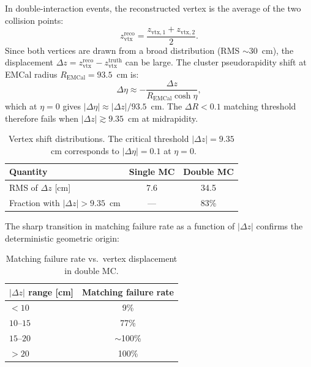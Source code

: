 \documentclass[11pt,a4paper]{article}
\newcommand{\DR}{\ensuremath{\Delta R}\xspace}
\begin{document}
In double-interaction events, the reconstructed vertex is the average of the two
collision points:
\begin{equation}
    z_{\text{vtx}}^{\text{reco}} = \frac{z_{\text{vtx},1} + z_{\text{vtx},2}}{2}.
\end{equation}
Since both vertices are drawn from a broad distribution (RMS ${\sim}30$~cm), the
displacement $\Delta z = z_{\text{vtx}}^{\text{reco}} - z_{\text{vtx}}^{\text{truth}}$
can be large.
The cluster pseudorapidity shift at EMCal radius $R_{\text{EMCal}} = 93.5$~cm is:
\begin{equation}
    \Delta\eta \approx -\frac{\Delta z}{R_{\text{EMCal}} \cosh\eta},
\end{equation}
which at $\eta = 0$ gives $|\Delta\eta| \approx |\Delta z| / 93.5$~cm.
The $\DR < 0.1$ matching threshold therefore fails when
$|\Delta z| \gtrsim 9.35$~cm at midrapidity.

\begin{table}[H]
    \centering
    \caption{Vertex shift distributions. The critical threshold $|\Delta z| = 9.35$~cm
      corresponds to $|\Delta\eta| = 0.1$ at $\eta = 0$.}
    \label{tab:vertex_shift}
    \begin{tabular}{lcc}
        \toprule
        Quantity & Single MC & Double MC \\
        \midrule
        RMS of $\Delta z$ [cm] & 7.6 & 34.5 \\
        Fraction with $|\Delta z| > 9.35$~cm & --- & 83\% \\
        \bottomrule
    \end{tabular}
\end{table}

The sharp transition in matching failure rate as a function of $|\Delta z|$
confirms the deterministic geometric origin:

\begin{table}[H]
    \centering
    \caption{Matching failure rate vs.\ vertex displacement in double MC.}
    \label{tab:failure_vs_dz}
    \begin{tabular}{lc}
        \toprule
        $|\Delta z|$ range [cm] & Matching failure rate \\
        \midrule
        $< 10$ & 9\% \\
        $10$--$15$ & 77\% \\
        $15$--$20$ & $\sim$100\% \\
        $> 20$ & 100\% \\
        \bottomrule
    \end{tabular}
\end{table}
\end{document}

